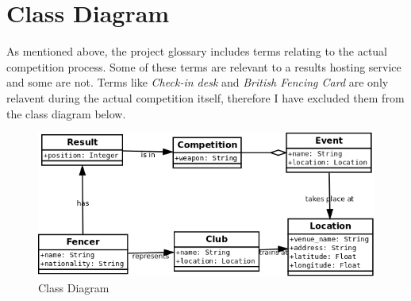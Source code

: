 \section{Class Diagram}
As mentioned above, the project glossary includes terms relating to the actual
competition process. Some of these terms are relevant to a results hosting
service and some are not. Terms like \textit{Check-in desk} and
\textit{British Fencing Card } are only relavent during the actual competition
itself, therefore I have excluded them from the class diagram below.
\begin{figure}[!ht]
    \includegraphics[width=\textwidth]{class_diagram}
    \caption{Class Diagram}
  \end{figure}